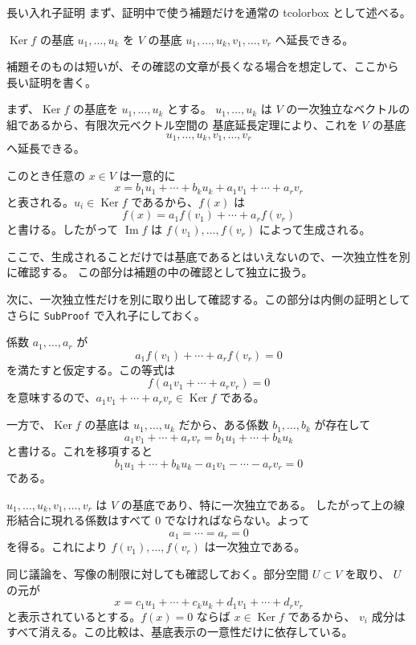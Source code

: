 \documentclass[a4paper,11pt]{ltjsarticle}
\begin{document}
\begin{Proof}{長い入れ子証明}
まず、証明中で使う補題だけを通常の tcolorbox として述べる。

\begin{tcolorbox}[
  enhanced,
  breakable,
  sharp corners,
  colback=white,
  colframe=black,
  fonttitle=\gtfamily\sffamily\bfseries,
  title={補題}
]
$\operatorname{Ker} f$ の基底 $u_1,\dots,u_k$ を
$V$ の基底 $u_1,\dots,u_k,v_1,\dots,v_r$ へ延長できる。
\end{tcolorbox}

\begin{SubProof}[補題の証明]
補題そのものは短いが、その確認の文章が長くなる場合を想定して、ここから
長い証明を書く。

まず、$\operatorname{Ker} f$ の基底を $u_1,\dots,u_k$ とする。
$u_1,\dots,u_k$ は $V$ の一次独立なベクトルの組であるから、有限次元ベクトル空間の
基底延長定理により、これを $V$ の基底
\[
  u_1,\dots,u_k,v_1,\dots,v_r
\]
へ延長できる。

このとき任意の $x\in V$ は一意的に
\[
  x=b_1u_1+\cdots+b_ku_k+a_1v_1+\cdots+a_rv_r
\]
と表される。$u_i\in\operatorname{Ker} f$ であるから、$f(x)$ は
\[
  f(x)=a_1f(v_1)+\cdots+a_rf(v_r)
\]
と書ける。したがって $\operatorname{Im} f$ は
$f(v_1),\dots,f(v_r)$ によって生成される。

ここで、生成されることだけでは基底であるとはいえないので、一次独立性を別に確認する。
この部分は補題の中の確認として独立に扱う。

次に、一次独立性だけを別に取り出して確認する。この部分は内側の証明として
さらに \texttt{SubProof} で入れ子にしておく。

\begin{SubProof}[一次独立性の確認]
係数 $a_1,\dots,a_r$ が
\[
  a_1f(v_1)+\cdots+a_rf(v_r)=0
\]
を満たすと仮定する。この等式は
\[
  f(a_1v_1+\cdots+a_rv_r)=0
\]
を意味するので、$a_1v_1+\cdots+a_rv_r\in\operatorname{Ker} f$ である。

一方で、$\operatorname{Ker} f$ の基底は $u_1,\dots,u_k$ だから、ある係数
$b_1,\dots,b_k$ が存在して
\[
  a_1v_1+\cdots+a_rv_r=b_1u_1+\cdots+b_ku_k
\]
と書ける。これを移項すると
\[
  b_1u_1+\cdots+b_ku_k-a_1v_1-\cdots-a_rv_r=0
\]
である。

$u_1,\dots,u_k,v_1,\dots,v_r$ は $V$ の基底であり、特に一次独立である。
したがって上の線形結合に現れる係数はすべて $0$ でなければならない。よって
\[
  a_1=\cdots=a_r=0
\]
を得る。これにより $f(v_1),\dots,f(v_r)$ は一次独立である。

同じ議論を、写像の制限に対しても確認しておく。部分空間 $U\subset V$ を取り、
$U$ の元が
\[
  x=c_1u_1+\cdots+c_ku_k+d_1v_1+\cdots+d_rv_r
\]
と表示されているとする。$f(x)=0$ ならば $x\in\operatorname{Ker} f$ であるから、
$v_i$ 成分はすべて消える。この比較は、基底表示の一意性だけに依存している。


\end{SubProof}
\end{SubProof}
\end{Proof}
\end{document}
